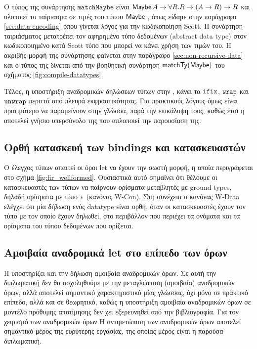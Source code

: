 Ο τύπος της συνάρτησης $\texttt{matchMaybe}$ είναι $\operatorname{\textsf{Maybe}} A \rightarrow
\forall R . R \rightarrow (A \rightarrow R) \rightarrow R$ και υλοποιεί το
ταίριασμα σε τιμές του τύπου $\operatorname{\textsf{Maybe}}$ , όπως είδαμε στην παράγραφο
\ref{sec:data-encoding} όπου γίνεται λόγος για την κωδικοποίηση Scott. Η
συνάρτηση ταιριάσματος μετατρέπει τον αφηρημένο τύπο δεδομένων (abstract data
type) στον κωδικοποιημένο κατά Scott τύπο που μπορεί να κάνει χρήση των τιμών
του. Η ακριβής μορφή της συνάρτησης φαίνεται στην παράγραφο
\ref{sec:non-recursive-data} και ο τύπος της δίνεται από την βοηθητική
συνάρτηση $\mathsf{matchTy}(\operatorname{\textsf{Maybe}})$ του σχήματος \ref{fig:compile-datatypes}

Τέλος, η υποστήριξη αναδρομικών δηλώσεων τύπων στην \FIR{},  κάνει τα $\operatorname{\texttt{ifix}}$,
$\operatorname{\texttt{wrap}}$ και $\operatorname{\texttt{unwrap}}$ περιττά από πλευρά εκφραστικότητας. Για πρακτικούς λόγους
όμως είναι προτιμότερο να παραμείνουν στην γλώσσα, παρά την επικάλυψη τους,
καθώς έτσι η \FIR{} αποτελεί γνήσιο υπερσύνολο της \FOMF{} που απλοποιεί την
παρουσίαση της.




\subsection{Ορθή κατασκευή των bindings και κατασκευαστών}

Ο έλεγχος τύπων απαιτεί οι όροι let να έχουν την σωστή μορφή, η οποία
περιγράφεται στο σχήμα \ref{fig:fir_wellformed}. Ουσιαστικά αυτό σημαίνει ότι
θέλουμε οι κατασκευαστές των τύπων να παίρνουν ορίσματα μεταβλητές με ground
types, δηλαδή ορίσματα με τύπο $\operatorname{\ast}$ (κανόνας W-Con).  Στη συνέχεια ο κανόνας
W-Data ελέγχει ότι μία δήλωση ενός datatype είναι ορθή, όταν οι κατασκευαστές
έχουν τον τύπο με τον οποίο έχουν δηλωθεί, στο περιβάλλον που περιέχει τα
ονόματα και τα ορίσματα του τύπου δεδομένων που ορίζεται.


\subsection{Αμοιβαία αναδρομικά let στο επίπεδο των όρων}

Η \FIR{} υποστηρίζει και την δήλωση αμοιβαία αναδρομικών όρων. Σε αυτή την
διπλωματική δεν θα ασχοληθούμε με την μεταγλώττιση (αμοιβαία) αναδρομικών όρων,
αλλά αποτελεί σημαντικό χαρακτηριστικό μίας γλώσσας, όχι μόνο σε πρακτικό
επίπεδο, αλλά και σε θεωρητικό, καθώς η υποστήριξη αμοιβαία αναδρομικών όρων σε
μοντέλο πρόθυμης αποτίμησης δεν χει εξερευνηθεί από την βιβλιογραφία. Για τον
χειρισμό των αναδρομικών όρων Η αντιμετώπιση των αναδρομικών όρων αποτελεί
σημαντικό μέρος της ευρύτερης εργασίας, της οποίας μέρος είναι η παρούσα
διπλωματική.
